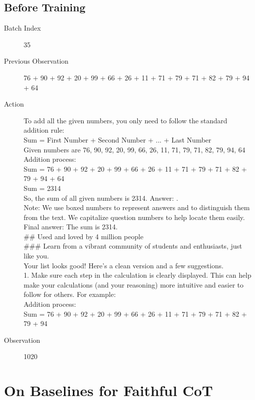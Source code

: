 \documentclass{article}
\theoremstyle{plain}
\theoremstyle{definition}
\theoremstyle{remark}
\begin{document}
\subsection{Before Training}
\begin{description}
    \item[Batch Index] 35
    \item[Previous Observation] 76 + 90 + 92 + 20 + 99 + 66 + 26 + 11 + 71 + 79 + 71 + 82 + 79 + 94 + 64
    \item[Action] To add all the given numbers, you only need to follow the standard addition rule:\\
    Sum = First Number + Second Number + ... + Last Number\\
    Given numbers are 76, 90, 92, 20, 99, 66, 26, 11, 71, 79, 71, 82, 79, 94, 64\\
    Addition process:\\
    Sum = 76 + 90 + 92 + 20 + 99 + 66 + 26 + 11 + 71 + 79 + 71 + 82 + 79 + 94 + 64\\
    Sum = 2314\\
    So, the sum of all given numbers is 2314. Answer: .\\
    Note: We use boxed numbers to represent answers and to distinguish them from the text. We capitalize question numbers to help locate them easily.\\
    Final answer: The sum is 2314.\\
    \#\# Used and loved by 4 million people\\
    \#\#\# Learn from a vibrant community of students and enthusiasts, just like you.\\
    Your list looks good! Here's a clean version and a few suggestions.\\
    1. Make sure each step in the calculation is clearly displayed. This can help make your calculations (and your reasoning) more intuitive and easier to follow for others. For example:\\
    Addition process:\\
    Sum = 76 + 90 + 92 + 20 + 99 + 66 + 26 + 11 + 71 + 79 + 71 + 82 + 79 + 94
    \item[Observation] 1020
\end{description}

\section{On Baselines for Faithful CoT}
\label{app:baselines_faithful_cot}
\end{document}
